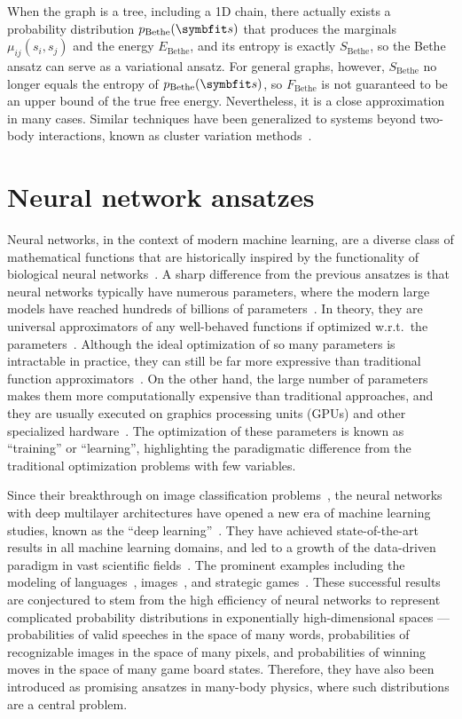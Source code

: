 When the graph is a tree, including a 1D chain, there actually exists a probability distribution $p_\text{Bethe}(\vs)$ that produces the marginals $\mu_{i j}(s_i, s_j)$ and the energy $E_\text{Bethe}$, and its entropy is exactly $S_\text{Bethe}$, so the Bethe ansatz can serve as a variational ansatz. For general graphs, however, $S_\text{Bethe}$ no longer equals the entropy of $p_\text{Bethe}(\vs)$, so $F_\text{Bethe}$ is not guaranteed to be an upper bound of the true free energy. Nevertheless, it is a close approximation in many cases. Similar techniques have been generalized to systems beyond two-body interactions, known as cluster variation methods~\cite{pelizzola2005cluster}.

\section{Neural network ansatzes}
\label{sec:nn}

Neural networks, in the context of modern machine learning, are a diverse class of mathematical functions that are historically inspired by the functionality of biological neural networks~\cite{mackay2003information, goodfellow2016deep}. A sharp difference from the previous ansatzes is that neural networks typically have numerous parameters, where the modern large models have reached hundreds of billions of parameters~\cite{brown2020language}. In theory, they are universal approximators of any well-behaved functions if optimized w.r.t.\ the parameters~\cite{hornik1989multilayer}. Although the ideal optimization of so many parameters is intractable in practice, they can still be far more expressive than traditional function approximators~\cite{sontag1998vc}. On the other hand, the large number of parameters makes them more computationally expensive than traditional approaches, and they are usually executed on graphics processing units (GPUs) and other specialized hardware~\cite{chen2020survey}. The optimization of these parameters is known as ``training'' or ``learning'', highlighting the paradigmatic difference from the traditional optimization problems with few variables.

Since their breakthrough on image classification problems~\cite{krizhevsky2012imagenet}, the neural networks with deep multilayer architectures have opened a new era of machine learning studies, known as the ``deep learning''~\cite{goodfellow2016deep}. They have achieved state-of-the-art results in all machine learning domains, and led to a growth of the data-driven paradigm in vast scientific fields~\cite{montans2019data}. The prominent examples including the modeling of languages~\cite{brown2020language}, images~\cite{rombach2022high}, and strategic games~\cite{silver2016mastering}. These successful results are conjectured to stem from the high efficiency of neural networks to represent complicated probability distributions in exponentially high-dimensional spaces --- probabilities of valid speeches in the space of many words, probabilities of recognizable images in the space of many pixels, and probabilities of winning moves in the space of many game board states. Therefore, they have also been introduced as promising ansatzes in many-body physics, where such distributions are a central problem.

